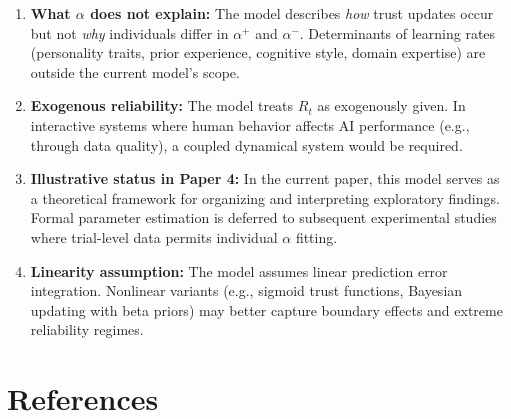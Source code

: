 \documentclass[12pt]{article}
\begin{document}
\begin{enumerate}
  \item \textbf{What $\alpha$ does not explain:}
    The model describes \textit{how} trust updates occur but not
    \textit{why} individuals differ in $\alpha^+$ and $\alpha^-$.
    Determinants of learning rates (personality traits, prior
    experience, cognitive style, domain expertise) are outside
    the current model's scope.

  \item \textbf{Exogenous reliability:}
    The model treats $R_t$ as exogenously given. In interactive
    systems where human behavior affects AI performance (e.g.,
    through data quality), a coupled dynamical system would be
    required.

  \item \textbf{Illustrative status in Paper 4:}
    In the current paper, this model serves as a theoretical
    framework for organizing and interpreting exploratory findings.
    Formal parameter estimation is deferred to subsequent
    experimental studies where trial-level data permits
    individual $\alpha$ fitting.

  \item \textbf{Linearity assumption:}
    The model assumes linear prediction error integration.
    Nonlinear variants (e.g., sigmoid trust functions, Bayesian
    updating with beta priors) may better capture boundary effects
    and extreme reliability regimes.
\end{enumerate}

\section*{References}
\end{document}
